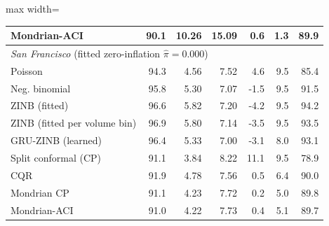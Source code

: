 \begin{table}[!htbp]
\begin{adjustbox}{max width=\linewidth}
\begin{tabular}{lrrrrrr}
Mondrian-ACI & 90.1 & 10.26 & 15.09 & 0.6 & 1.3 & 89.9 \\
\midrule
\multicolumn{7}{l}{\textit{San Francisco} (fitted zero-inflation $\hat\pi=0.000$)}\\
Poisson & 94.3 & 4.56 & 7.52 & 4.6 & 9.5 & 85.4 \\
Neg. binomial & 95.8 & 5.30 & 7.07 & -1.5 & 9.5 & 91.5 \\
ZINB (fitted) & 96.6 & 5.82 & 7.20 & -4.2 & 9.5 & 94.2 \\
ZINB (fitted per volume bin) & 96.9 & 5.80 & 7.14 & -3.5 & 9.5 & 93.5 \\
GRU-ZINB (learned) & 96.4 & 5.33 & 7.00 & -3.1 & 8.0 & 93.1 \\
Split conformal (CP) & 91.1 & 3.84 & 8.22 & 11.1 & 9.5 & 78.9 \\
CQR & 91.9 & 4.78 & 7.56 & 0.5 & 6.4 & 90.0 \\
Mondrian CP & 91.1 & 4.23 & 7.72 & 0.2 & 5.0 & 89.8 \\
Mondrian-ACI & 91.0 & 4.22 & 7.73 & 0.4 & 5.1 & 89.7 \\
\bottomrule\end{tabular}\end{adjustbox}\end{table}

